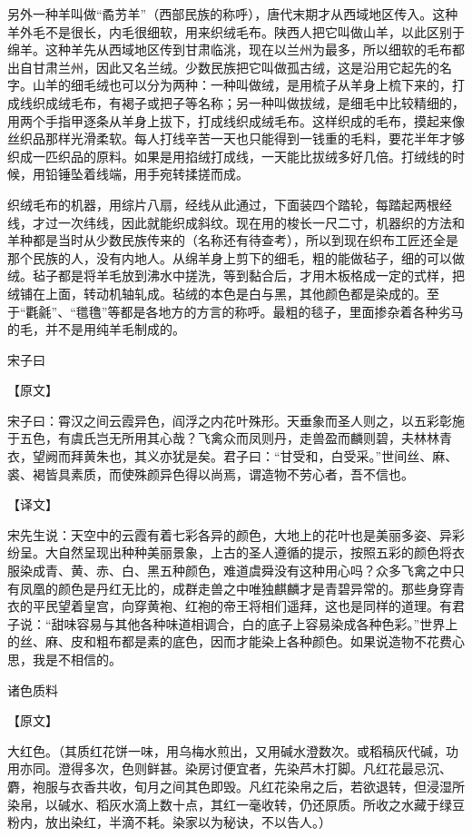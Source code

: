 \documentclass[12pt,UTF8]{ctexbook}
\begin{document}
另外一种羊叫做“矞艻羊”（西部民族的称呼），唐代末期才从西域地区传入。这种羊外毛不是很长，内毛很细软，用来织绒毛布。陕西人把它叫做山羊，以此区别于绵羊。这种羊先从西域地区传到甘肃临洮，现在以兰州为最多，所以细软的毛布都出自甘肃兰州，因此又名兰绒。少数民族把它叫做孤古绒，这是沿用它起先的名字。山羊的细毛绒也可以分为两种：一种叫做绒，是用梳子从羊身上梳下来的，打成线织成绒毛布，有褐子或把子等名称；另一种叫做拔绒，是细毛中比较精细的，用两个手指甲逐条从羊身上拔下，打成线织成绒毛布。这样织成的毛布，摸起来像丝织品那样光滑柔软。每人打线辛苦一天也只能得到一钱重的毛料，要花半年才够织成一匹织品的原料。如果是用掐绒打成线，一天能比拔绒多好几倍。打绒线的时候，用铅锤坠着线端，用手宛转揉搓而成。

织绒毛布的机器，用综片八扇，经线从此通过，下面装四个踏轮，每踏起两根经线，才过一次纬线，因此就能织成斜纹。现在用的梭长一尺二寸，机器织的方法和羊种都是当时从少数民族传来的（名称还有待查考），所以到现在织布工匠还全是那个民族的人，没有内地人。从绵羊身上剪下的细毛，粗的能做毡子，细的可以做绒。毡子都是将羊毛放到沸水中搓洗，等到黏合后，才用木板格成一定的式样，把绒铺在上面，转动机轴轧成。毡绒的本色是白与黑，其他颜色都是染成的。至于“氍毹”、“氆氇”等都是各地方的方言的称呼。最粗的毯子，里面掺杂着各种劣马的毛，并不是用纯羊毛制成的。

宋子曰

【原文】

宋子曰：霄汉之间云霞异色，阎浮之内花叶殊形。天垂象而圣人则之，以五彩彰施于五色，有虞氏岂无所用其心哉？飞禽众而凤则丹，走兽盈而麟则碧，夫林林青衣，望阙而拜黄朱也，其义亦犹是矣。君子曰：“甘受和，白受采。”世间丝、麻、裘、褐皆具素质，而使殊颜异色得以尚焉，谓造物不劳心者，吾不信也。

【译文】

宋先生说：天空中的云霞有着七彩各异的颜色，大地上的花叶也是美丽多姿、异彩纷呈。大自然呈现出种种美丽景象，上古的圣人遵循的提示，按照五彩的颜色将衣服染成青、黄、赤、白、黑五种颜色，难道虞舜没有这种用心吗？众多飞禽之中只有凤凰的颜色是丹红无比的，成群走兽之中唯独麒麟才是青碧异常的。那些身穿青衣的平民望着皇宫，向穿黄袍、红袍的帝王将相们遥拜，这也是同样的道理。有君子说：“甜味容易与其他各种味道相调合，白的底子上容易染成各种色彩。”世界上的丝、麻、皮和粗布都是素的底色，因而才能染上各种颜色。如果说造物不花费心思，我是不相信的。

诸色质料

【原文】

大红色。（其质红花饼一味，用乌梅水煎出，又用碱水澄数次。或稻稿灰代碱，功用亦同。澄得多次，色则鲜甚。染房讨便宜者，先染芦木打脚。凡红花最忌沉、麝，袍服与衣香共收，旬月之间其色即毁。凡红花染帛之后，若欲退转，但浸湿所染帛，以碱水、稻灰水滴上数十点，其红一毫收转，仍还原质。所收之水藏于绿豆粉内，放出染红，半滴不耗。染家以为秘诀，不以告人。）
\end{document}

